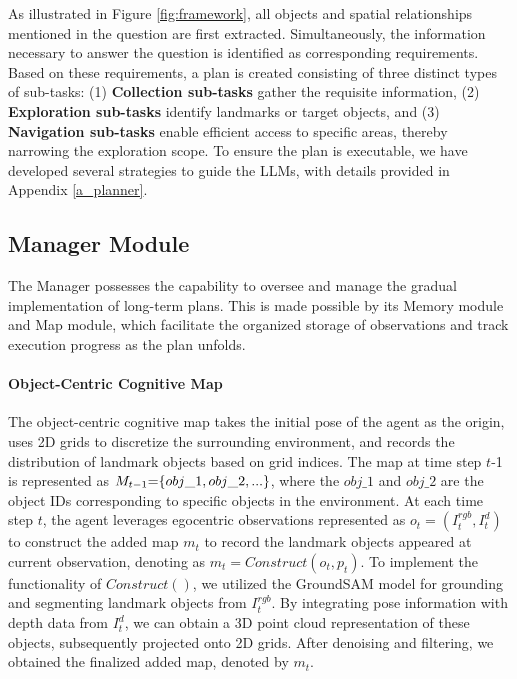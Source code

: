 As illustrated in Figure \ref{fig:framework}, all objects and spatial relationships mentioned in the question are first extracted. Simultaneously, the information necessary to answer the question is identified as corresponding requirements. Based on these requirements, a plan is created consisting of three distinct types of sub-tasks: (1) \textbf{Collection sub-tasks} gather the requisite information, (2) \textbf{Exploration sub-tasks}  identify landmarks or target objects, and (3) \textbf{Navigation sub-tasks} enable efficient access to specific areas, thereby narrowing the exploration scope. To ensure the plan is executable, we have developed several strategies to guide the LLMs, with details provided in Appendix \ref{a_planner}.


\subsection{Manager Module}

The Manager possesses the capability to oversee and manage the gradual implementation of long-term plans. This is made possible by its Memory module and Map module, which facilitate the organized storage of observations and track execution progress as the plan unfolds.

\paragraph{Object-Centric Cognitive Map} 
The object-centric cognitive map takes the initial pose of the agent as the origin, uses 2D grids to discretize the surrounding environment, and  records the distribution of landmark objects based on grid indices. The map at time step $t$-1 is represented as ${M_{t{\rm{ - }}1}}{\rm{ = }}\{ obj\_1,{\rm{ }}obj\_2,{\rm{ }}...\} $, where the $obj\_1$ and $obj\_2$ are the object IDs corresponding to specific objects in the environment. At each time step $t$,  the agent leverages egocentric observations represented as ${{o}_{t}}=(I_{t}^{rgb},I_{t}^{d})$ to construct the added map ${{m}_{t}}$ to record the landmark objects appeared at current observation, denoting as ${{m}_{t}}=Construct({{o}_{t}, p_t})$. To implement the functionality of $Construct()$, we utilized the GroundSAM model \cite{bousselham2024grounding} for grounding and segmenting landmark objects from $I_{t}^{rgb}$. By integrating pose information with depth data from $I_{t}^{d}$, we can obtain a 3D point cloud representation of these objects, subsequently projected onto 2D grids. After denoising and filtering, we obtained the finalized added map, denoted by ${{m}_{t}}$.

